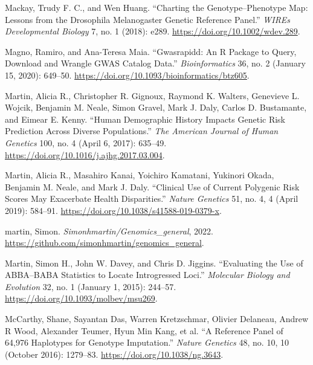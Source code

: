 \documentclass[
  9pt,
]{book}
\newlength{\cslhangindent}
\newlength{\cslentryspacingunit} %
\newenvironment{CSLReferences}[2] %
 {%
  \setlength{\parindent}{0pt}
  \ifodd #1
  \let\oldpar\par
  \def\par{\hangindent=\cslhangindent\oldpar}
  \fi
  \setlength{\parskip}{#2\cslentryspacingunit}
 }%
 {}
\begin{document}
\begin{CSLReferences}{1}{0}
\leavevmode{}%
Mackay, Trudy F. C., and Wen Huang. {``Charting the Genotype--Phenotype Map: Lessons from the {Drosophila} Melanogaster {Genetic Reference Panel}.''} \emph{WIREs Developmental Biology} 7, no. 1 (2018): e289. \url{https://doi.org/10.1002/wdev.289}.

\leavevmode{}%
Magno, Ramiro, and Ana-Teresa Maia. {``Gwasrapidd: An {R} Package to Query, Download and Wrangle {GWAS} Catalog Data.''} \emph{Bioinformatics} 36, no. 2 (January 15, 2020): 649--50. \url{https://doi.org/10.1093/bioinformatics/btz605}.

\leavevmode{}%
Martin, Alicia R., Christopher R. Gignoux, Raymond K. Walters, Genevieve L. Wojcik, Benjamin M. Neale, Simon Gravel, Mark J. Daly, Carlos D. Bustamante, and Eimear E. Kenny. {``Human {Demographic History Impacts Genetic Risk Prediction} Across {Diverse Populations}.''} \emph{The American Journal of Human Genetics} 100, no. 4 (April 6, 2017): 635--49. \url{https://doi.org/10.1016/j.ajhg.2017.03.004}.

\leavevmode{}%
Martin, Alicia R., Masahiro Kanai, Yoichiro Kamatani, Yukinori Okada, Benjamin M. Neale, and Mark J. Daly. {``Clinical Use of Current Polygenic Risk Scores May Exacerbate Health Disparities.''} \emph{Nature Genetics} 51, no. 4, 4 (April 2019): 584--91. \url{https://doi.org/10.1038/s41588-019-0379-x}.

\leavevmode{}%
martin, Simon. \emph{Simonhmartin/Genomics\_general}, 2022. \url{https://github.com/simonhmartin/genomics_general}.

\leavevmode{}%
Martin, Simon H., John W. Davey, and Chris D. Jiggins. {``Evaluating the {Use} of {ABBA}--{BABA Statistics} to {Locate Introgressed Loci}.''} \emph{Molecular Biology and Evolution} 32, no. 1 (January 1, 2015): 244--57. \url{https://doi.org/10.1093/molbev/msu269}.

\leavevmode{}%
McCarthy, Shane, Sayantan Das, Warren Kretzschmar, Olivier Delaneau, Andrew R Wood, Alexander Teumer, Hyun Min Kang, et al. {``A Reference Panel of 64,976 Haplotypes for Genotype Imputation.''} \emph{Nature Genetics} 48, no. 10, 10 (October 2016): 1279--83. \url{https://doi.org/10.1038/ng.3643}.


\end{CSLReferences}
\end{document}

